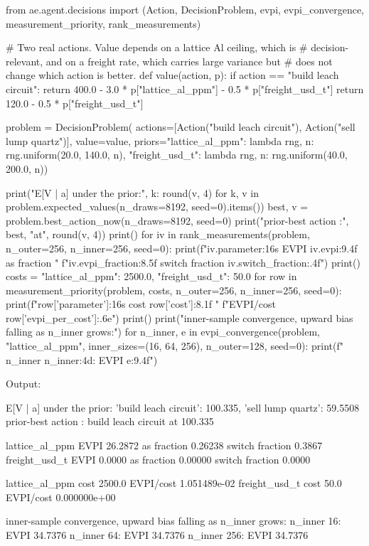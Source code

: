 \documentclass[10pt,a4paper,twoside]{report}
\begin{document}
\begin{doctestblock}
from ae.agent.decisions import (Action, DecisionProblem, evpi, evpi_convergence,
                                measurement_priority, rank_measurements)

# Two real actions. Value depends on a lattice Al ceiling, which is
# decision-relevant, and on a freight rate, which carries large variance but
# does not change which action is better.
def value(action, p):
    if action == "build leach circuit":
        return 400.0 - 3.0 * p["lattice_al_ppm"] - 0.5 * p["freight_usd_t"]
    return 120.0 - 0.5 * p["freight_usd_t"]

problem = DecisionProblem(
    actions=[Action("build leach circuit"), Action("sell lump quartz")],
    value=value,
    priors={"lattice_al_ppm": lambda rng, n: rng.uniform(20.0, 140.0, n),
            "freight_usd_t": lambda rng, n: rng.uniform(40.0, 200.0, n)})

print("E[V | a] under the prior:",
      {k: round(v, 4) for k, v in problem.expected_values(n_draws=8192, seed=0).items()})
best, v = problem.best_action_now(n_draws=8192, seed=0)
print("prior-best action       :", best, "at", round(v, 4))
print()
for iv in rank_measurements(problem, n_outer=256, n_inner=256, seed=0):
    print(f"{iv.parameter:16s} EVPI {iv.evpi:9.4f}  as fraction "
          f"{iv.evpi_fraction:8.5f}  switch fraction {iv.switch_fraction:.4f}")
print()
costs = {"lattice_al_ppm": 2500.0, "freight_usd_t": 50.0}
for row in measurement_priority(problem, costs, n_outer=256, n_inner=256, seed=0):
    print(f"{row['parameter']:16s} cost {row['cost']:8.1f}  "
          f"EVPI/cost {row['evpi_per_cost']:.6e}")
print()
print("inner-sample convergence, upward bias falling as n_inner grows:")
for n_inner, e in evpi_convergence(problem, "lattice_al_ppm",
                                   inner_sizes=(16, 64, 256), n_outer=128, seed=0):
    print(f"  n_inner {n_inner:4d}: EVPI {e:9.4f}")
\end{doctestblock}

{\footnotesize\color{slate}Output:\par}

\begin{outputblock}
E[V | a] under the prior: {'build leach circuit': 100.335, 'sell lump quartz': 59.5508}
prior-best action       : build leach circuit at 100.335

lattice_al_ppm   EVPI   26.2872  as fraction  0.26238  switch fraction 0.3867
freight_usd_t    EVPI    0.0000  as fraction  0.00000  switch fraction 0.0000

lattice_al_ppm   cost   2500.0  EVPI/cost 1.051489e-02
freight_usd_t    cost     50.0  EVPI/cost 0.000000e+00

inner-sample convergence, upward bias falling as n_inner grows:
  n_inner   16: EVPI   34.7376
  n_inner   64: EVPI   34.7376
  n_inner  256: EVPI   34.7376
\end{outputblock}
\end{document}
